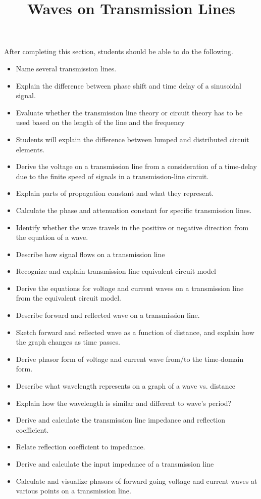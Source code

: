 \documentclass{ximera}
\title{Waves on Transmission Lines}
\begin{document}
\begin{abstract}
\end{abstract}

\maketitle

\begin{sectionOutcomes}

After completing this section, students should be able to do the following.

\begin{itemize}
\item Name several transmission lines.
\item Explain the difference between phase shift and time delay of a sinusoidal signal.
\item Evaluate whether the transmission line theory or circuit theory has to be used based on the length of the line and the frequency
\item Students will explain the difference between lumped and distributed circuit elements.
\item Derive the voltage on a transmission line from a consideration of a time-delay due to the finite speed of signals in a transmission-line circuit.
\item Explain parts of propagation constant and what they represent.
\item Calculate the phase and attenuation constant for specific transmission lines.
\item Identify whether the wave travels in the positive or negative direction from the equation of a wave.
\item Describe how signal flows on a transmission line
\item Recognize and explain transmission line equivalent circuit model
\item Derive the equations for voltage and current waves on a transmission line from the equivalent circuit model.
\item Describe forward and reflected wave on a transmission line.
\item Sketch forward and reflected wave as a function of distance, and explain how the graph changes as time passes.
\item Derive phasor form of voltage and current wave from/to the time-domain form.
\item Describe what wavelength represents on a graph of a wave vs. distance
\item Explain how the wavelength is similar and different to wave’s period?
\item Derive and calculate the transmission line impedance and reflection coefficient.
\item Relate reflection coefficient to impedance.
\item Derive and calculate the input impedance of a transmission line
\item Calculate and visualize phasors of forward going voltage and current waves at various points on a transmission line.
\end{itemize}

\end{sectionOutcomes}
\end{document}
